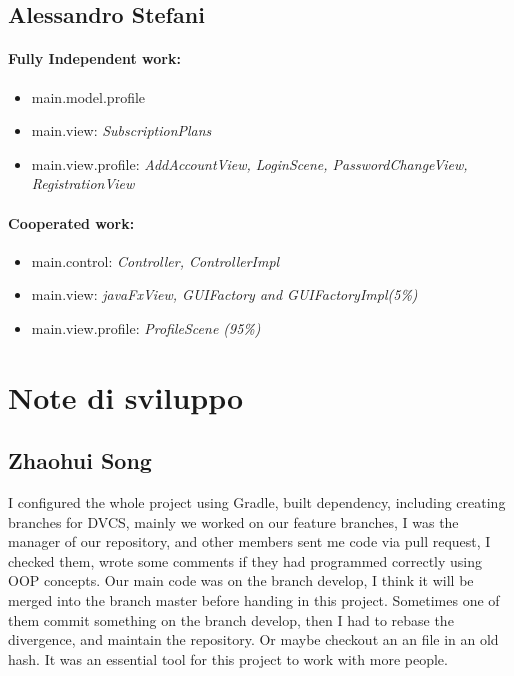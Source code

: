 \documentclass[a4paper,12pt]{report}
\begin{document}
\subsection{Alessandro Stefani}
\paragraph*{Fully Independent work:}
\begin{itemize}
    \item main.model.profile
    \item main.view: \textit{SubscriptionPlans}
    \item main.view.profile: \textit{AddAccountView, LoginScene, PasswordChangeView, RegistrationView}
\end{itemize}
\paragraph*{Cooperated work:}
\begin{itemize}
    \item main.control: \textit{Controller, ControllerImpl}
    \item main.view: \textit{javaFxView, GUIFactory and GUIFactoryImpl(5\%)}
    \item main.view.profile: \textit{ProfileScene (95\%)}
\end{itemize}

\section{Note di sviluppo}

\subsection{Zhaohui Song}
I configured the whole project using Gradle, built dependency, including creating branches for DVCS, 
%
mainly we worked on our feature branches, I was the manager of our repository, and other members sent me code via pull request, I checked them, wrote some comments if they had programmed correctly using OOP concepts. 
%
Our main code was on the branch develop, I think it will be merged into the branch master before handing in this project.
%
Sometimes one of them commit something on the branch develop, then I had to rebase the divergence, and maintain the repository. Or maybe checkout an an file in an old hash. It was an essential tool for this project to work with more people. 
\end{document}

